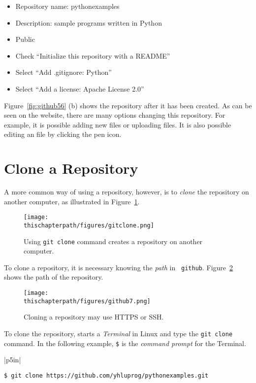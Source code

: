 \begin{itemize}
\item Repository name: pythonexamples
\item Description: sample programs written in Python
\item Public
\item Check ``Initialize this repository with a README''
\item Select ``Add .gitignore: Python''
\item Select ``Add a license: Apache License 2.0''
\end{itemize}


Figure~\ref{fig:github56} (b) shows the repository after it has been
created.  As can be seen on the website, there are many options
changing this repository.  For example, it is possible adding new
files or uploading files. It is also possible editing an file by
clicking the pen icon.

\section{Clone a Repository}

A more common way of using a repository, however, is to {\it clone} the
repository on another computer, as illustrated in Figure~\ref{fig:gitclone}.

\begin{figure}[h] \centering
{\texttt{[image: \\thischapterpath/figures/gitclone.png]}}
\caption{Using {\tt git clone} command creates a repository on another computer.}
\label{fig:gitclone}
\end{figure}

To clone a repository, it is necessary knowing the {\it path} in {\tt
  github}.  Figure~\ref{fig:github7} shows the path of the repository.

\begin{figure}[h] \centering
{\texttt{[image: \\thischapterpath/figures/github7.png]}}
\caption{Cloning a repository may use HTTPS or SSH.}
\label{fig:github7}
\end{figure}


\clearpage

To clone the repository, starts a {\it Terminal} in Linux
and type the {\tt git clone} command. In the following
example, {\tt \$} is the {\it command prompt} for the Terminal.

\vspace{0.2in}

\noindent
\begin{tabular}{|p{5in}|}\hline
\begin{verbatim}
$ git clone https://github.com/yhluprog/pythonexamples.git
\end{verbatim}
\\ \hline
\end{tabular}
\vspace{0.2in}

